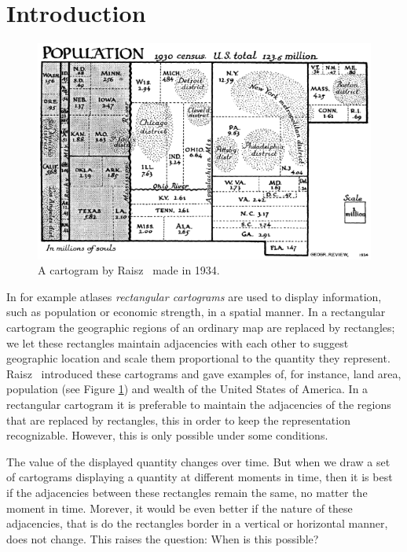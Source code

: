 
\section{Introduction}
\thispagestyle{plain}


  \begin{figure}[!t]
    \centering
    \includegraphics[scale=.5]{introduction/img/cartogram.png}
    \caption{A cartogram by Raisz~\cite{Raisz1934} made in 1934.}
    \label{fig:intro:raisz}
  \end{figure}
  In for example atlases \emph{rectangular cartograms} are used to display information, such as population or economic strength, in a spatial manner.
  In a rectangular cartogram  the geographic regions of an ordinary map are replaced by rectangles; we let these rectangles maintain adjacencies with each other to suggest geographic location and scale them proportional to the quantity they represent.
  Raisz~\cite{Raisz1934} introduced these cartograms and gave examples of, for instance, land area, population (see Figure  \ref{fig:intro:raisz}) and wealth of the United States of America.
  In a rectangular cartogram it is preferable to maintain the adjacencies of the regions that are replaced by rectangles, this in order to keep the representation recognizable.
  However, this is only possible under some conditions.

  The value of the displayed quantity changes over time.
  But when we draw a set of cartograms displaying a quantity at different moments in time, then it is best if the adjacencies between these rectangles remain the same, no matter the moment in time.
  Morever, it would be even better if the nature of these adjacencies, that is do the rectangles border in a vertical or horizontal manner, does not change.
  This raises the question: When is this possible?

